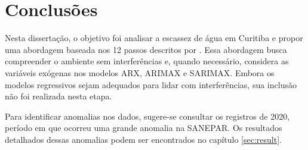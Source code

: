\section{Conclus\~oes} \label{sec:conclusoes}

Nesta dissertação, o objetivo foi analisar a escassez de água em Curitiba e propor uma abordagem baseada nos 12 passos descritos por . Essa abordagem busca compreender o ambiente sem interferências e, quando necessário, considera as variáveis exógenas nos modelos ARX, ARIMAX e SARIMAX. Embora os modelos regressivos sejam adequados para lidar com interferências, sua inclusão não foi realizada nesta etapa.

Para identificar anomalias nos dados, sugere-se consultar os registros de 2020, período em que ocorreu uma grande anomalia na SANEPAR. Os resultados detalhados dessas anomalias podem ser encontrados no capítulo \ref{sec:result}.

